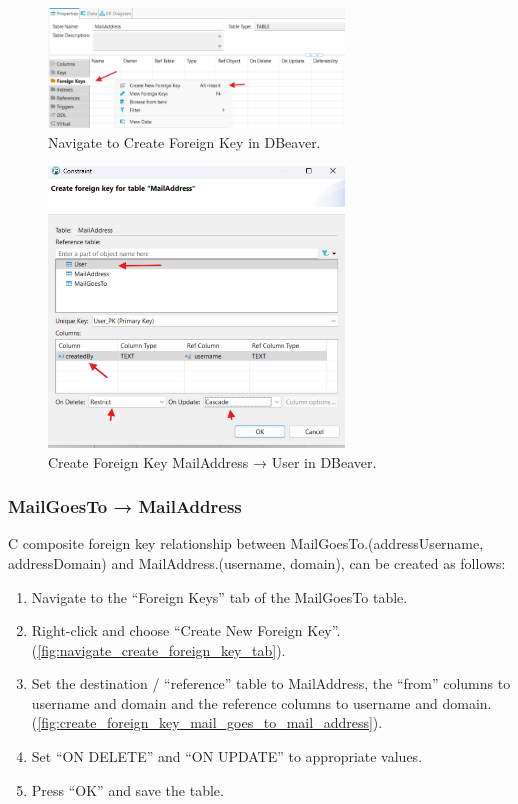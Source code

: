 \documentclass[a4paper,11pt,oneside]{article}
\begin{document}
\begin{sloppypar}
\begin{figure}[!htb]
  \centering
  \includegraphics[width=0.7\textwidth]{dbeaver/navigate_create_foreign_key_tab.png}
  \caption{Navigate to Create Foreign Key in DBeaver.}
  \label{fig:navigate_create_foreign_key_tab}
\end{figure}

\begin{figure}[!htb]
  \centering
  \includegraphics[width=0.7\textwidth]{dbeaver/create_foreign_key_mail_address_user.png}
  \caption{Create Foreign Key MailAddress → User in DBeaver.}
  \label{fig:create_foreign_key_mail_address_user}
\end{figure}



\subsubsection{MailGoesTo → MailAddress}
\label{dbeaverMailGoesToMailAddressRelationship}
C composite foreign key relationship between MailGoesTo.(addressUsername, addressDomain) and MailAddress.(username, domain), can be created as follows:

\begin{enumerate}
  \item Navigate to the ``Foreign Keys'' tab of the MailGoesTo table.
  \item Right-click and choose ``Create New Foreign Key''. (\autoref{fig:navigate_create_foreign_key_tab}).
  \item Set the destination / ``reference'' table to MailAddress, the ``from'' columns to username and domain and the reference columns to username and domain. (\autoref{fig:create_foreign_key_mail_goes_to_mail_address}).
  \item Set ``ON DELETE'' and ``ON UPDATE'' to appropriate values.
  \item Press ``OK'' and save the table.
\end{enumerate}


\end{sloppypar}
\end{document}
